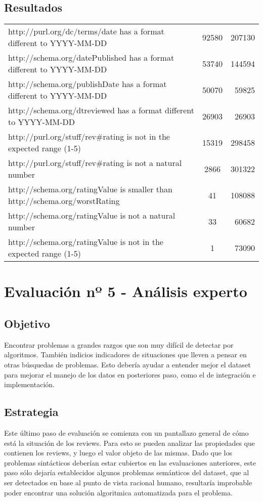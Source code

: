 \subsection*{Resultados}
\begin{tabular}{| l | c | r | }
http://purl.org/dc/terms/date has a format different to YYYY-MM-DD & 92580 & 207130\\
http://schema.org/datePublished has a format different to YYYY-MM-DD & 53740 & 144594\\
http://schema.org/publishDate has a format different to YYYY-MM-DD & 50070 & 59825\\
http://schema.org/dtreviewed has a format different to YYYY-MM-DD & 26903 & 26903\\ 
http://purl.org/stuff/rev\#rating is not in the expected range (1-5) & 15319 & 298458\\
http://purl.org/stuff/rev\#rating is not a natural number & 2866 & 301322\\
http://schema.org/ratingValue is smaller than http://schema.org/worstRating & 41 & 108088 \\
http://schema.org/ratingValue is not a natural number & 33 & 60682\\
http://schema.org/ratingValue is not in the expected range (1-5) & 1 & 73090 
\end{tabular}

\section{Evaluación nº 5 - Análisis experto}
\label{section:evaluacion-analisis}

\subsection*{Objetivo} Encontrar problemas a grandes razgos que son muy difícil de detectar por algoritmos. También indicios indicadores de 
situaciones que lleven a pensar en otras búsquedas de problemas. Esto debería ayudar a entender mejor el dataset para mejorar el manejo 
de los datos en posteriores paso, como el de integración e implementación.

\subsection*{Estrategia} Este último paso de evaluación se comienza con un pantallazo general de cómo está la situación de los reviews. Para esto se pueden analizar las propiedades que contienen los reviews, y luego el valor objeto 
de las mismas. Dado que los problemas sintácticos deberían estar cubiertos en las evaluaciones anteriores, este paso sólo dejaría establecidos
algunos problemas semánticos del dataset, que al ser detectados en base al punto de vista racional humano, resultaría improbable poder encontrar
una solución algoritmica automatizada para el problema.

